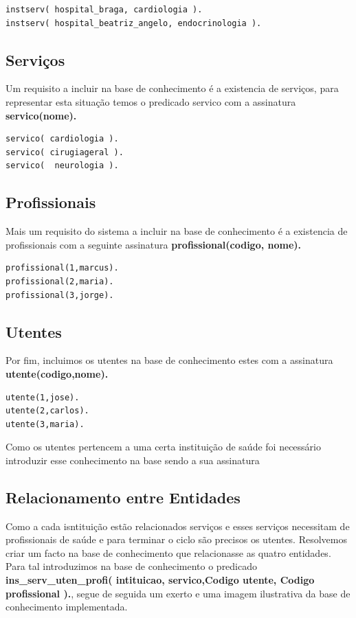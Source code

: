 \begin{verbatim}
instserv( hospital_braga, cardiologia ).
instserv( hospital_beatriz_angelo, endocrinologia ).
\end{verbatim}

\subsection{Serviços}
Um requisito a incluir na base de conhecimento é a existencia de serviços, para representar esta situação temos o predicado servico com a assinatura \textbf{servico(nome).}

\begin{Verbatim}
servico( cardiologia ). 
servico( cirugiageral ).
servico(  neurologia ).
\end{Verbatim}

\subsection{Profissionais}
Mais um requisito do sistema a incluir na base de conhecimento é a existencia de profissionais com a seguinte assinatura \textbf{profissional(codigo, nome).}

\begin{Verbatim}
profissional(1,marcus).
profissional(2,maria).
profissional(3,jorge).
\end{Verbatim}

\subsection{Utentes }
Por fim, incluimos os utentes na base de conhecimento estes com a assinatura \textbf{utente(codigo,nome).}

\begin{Verbatim}
utente(1,jose).  
utente(2,carlos). 
utente(3,maria). 
\end{Verbatim}

Como os utentes pertencem a uma certa instituição de saúde foi necessário introduzir esse conhecimento na base sendo a sua assinatura


\subsection{Relacionamento entre Entidades}
Como a cada isntituição estão relacionados serviços e esses serviços necessitam de profissionais de saúde e para terminar o ciclo são precisos os utentes. Resolvemos criar um facto na base de conhecimento que relacionasse as quatro entidades. Para tal introduzimos na base de conhecimento o predicado \textbf{ins\_serv\_uten\_profi( intituicao, servico,Codigo utente, Codigo profissional ).}, segue de seguida um exerto e uma imagem ilustrativa da base de conhecimento implementada. 

